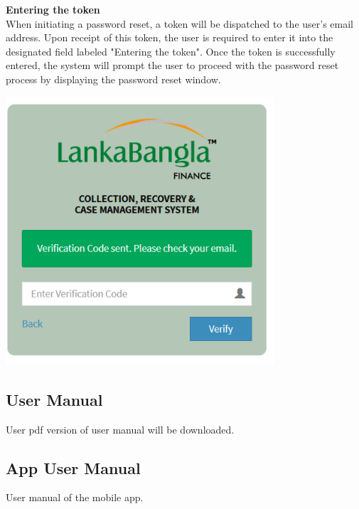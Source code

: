 \documentclass{article}
\begin{document}
\textbf{Entering the token}\\
When initiating a password reset, a token will be dispatched to the user's email address. Upon receipt of this token, the user is required to enter it into the designated field labeled "Entering the token". Once the token is successfully entered, the system will prompt the user to proceed with the password reset process by displaying the password reset window.
\begin{center}
    \includegraphics[width=0.75\textwidth]{image/verification_code_send.png}
\end{center}




\subsection{User Manual}
User pdf version of user manual will be downloaded. 

\subsection{App User Manual}
User manual of the mobile app.


\end{document}
